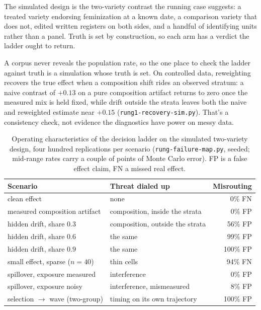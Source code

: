 The simulated design is the two-variety contrast the running case suggests: a treated variety endorsing feminization at a known date, a comparison variety that does not, edited written registers on both sides, and a handful of identifying units rather than a panel. Truth is set by construction, so each arm has a verdict the ladder ought to return.

A corpus never reveals the population rate, so the one place to check the ladder against truth is a simulation whose truth is set. On controlled data, reweighting recovers the true effect when a composition shift rides an observed stratum: a naive contrast of $+0.13$ on a pure composition artifact returns to zero once the measured mix is held fixed, while drift outside the strata leaves both the naive and reweighted estimate near $+0.15$ (\texttt{rung1-recovery-sim.py}). That's a consistency check, not evidence the diagnostics have power on messy data.

\begin{table}[t]
\centering
\footnotesize
\caption{Operating characteristics of the decision ladder on the simulated two-variety design, four hundred replications per scenario (\texttt{rung-failure-map.py}, seeded; mid-range rates carry a couple of points of Monte Carlo error). FP is a false effect claim, FN a missed real effect.}
\label{tab:failuremap}
\begin{tabular}{@{}l l r@{}}
\toprule
Scenario & Threat dialed up & Misrouting \\
\midrule
clean effect                     & none                            & 0\% FN \\
measured composition artifact    & composition, inside the strata  & 0\% FP \\
hidden drift, share $0.3$        & composition, outside the strata & 56\% FP \\
hidden drift, share $0.6$        & the same                        & 99\% FP \\
hidden drift, share $0.9$        & the same                        & 100\% FP \\
small effect, sparse ($n=40$)    & thin cells                      & 94\% FN \\
spillover, exposure measured     & interference                    & 0\% FP \\
spillover, exposure noisy        & interference, mismeasured       & 8\% FP \\
selection $\to$ wave (two-group) & timing on its own trajectory    & 100\% FP \\
\bottomrule
\end{tabular}
\end{table}

